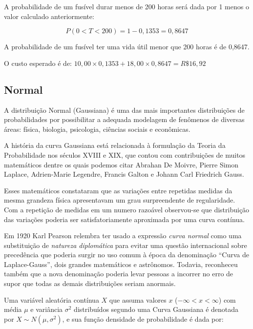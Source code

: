 \documentclass[
]{book}
\begin{document}
\hfill\break

A probabilidade de um fusível durar menos de 200 horas será dada por 1 menos o valor calculado anteriormente:

\hfill\break

\[
P( 0 < T < 200) = 1 - 0,1353 = 0,8647
\]

A probabilidade de um fusível ter uma vida útil menor que 200 horas é de 0,8647.

\hfill\break

O custo esperado é de: \(10,00 \times 0,1353 + 18,00 \times 0,8647 = R\$ 16,92\)

\hypertarget{normal}{%
\subsection{Normal}\label{normal}}

A distribuição Normal (Gaussiana) é uma das mais importantes distribuições de probabilidades por possibilitar a adequada modelagem de fenômenos de diversas áreas: física, biologia, psicologia, ciências sociais e econômicas.

\hfill\break

A história da curva Gaussiana está relacionada à formulação da Teoria da Probabilidade nos séculos XVIII e XIX, que contou com contribuições de muitos matemáticos dentre os quais podemos citar Abrahan De Moivre, Pierre Simon Laplace, Adrien-Marie Legendre, Francis Galton e Johann Carl Friedrich Gauss.

\hfill\break

Esses matemáticos constataram que as variações entre repetidas medidas da mesma grandeza física apresentavam um grau surpreendente de regularidade. Com a repetição de medidas em um numero razoável observou-se que distribuição das variações poderia ser satisfatoriamente aproximada por uma curva contínua.

\hfill\break

Em 1920 Karl Pearson relembra ter usado a expressão \emph{curva normal} como uma substituição de \emph{natureza diplomática} para evitar uma questão internacional sobre precedência que poderia surgir no uso comum à época da denominação ``Curva de Laplace-Gauss'', dois grandes matemáticos e astrônomos. Todavia, reconheceu também que a nova denominação poderia levar pessoas a incorrer no erro de supor que todas as demais distribuições seriam anormais.

\hfill\break

Uma variável aleatória contínua \(X\) que assuma valores \(x\) (\(-\infty < x < \infty\)) com média \(\mu\) e variância \(\sigma^{2}\) distribuídos segundo uma Curva Gaussiana é denotada por \(X \sim N(\mu, \sigma^{2})\), e sua função densidade de probabilidade é dada por:
\end{document}
